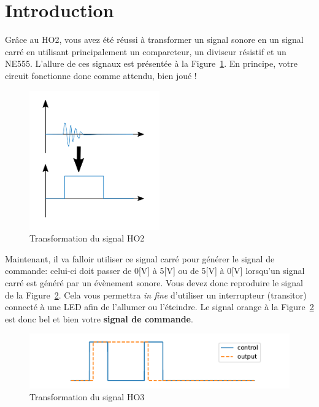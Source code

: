 \section{Introduction}

Grâce au HO2, vous avez été réussi à transformer un signal sonore en un signal carré en utilisant principalement un compareteur, un diviseur résistif et un NE555. L'allure de ces signaux est présentée à la Figure~\ref{fig:signal-all}. En principe, votre circuit fonctionne donc comme attendu, bien joué !

\begin{figure}[h!]
    \centering
    \includegraphics[width=0.5\textwidth]{signals.PNG}
    \caption{Transformation du signal HO2}
    \label{fig:signal-all}
\end{figure}

Maintenant, il va falloir utiliser ce signal carré pour générer le signal de commande: celui-ci doit passer de 0[V] à 5[V] ou de 5[V] à 0[V] lorsqu'un signal carré est généré par un évènement sonore. Vous devez donc reproduire le signal de la Figure~\ref{fig:signal-all_HO3}. Cela vous permettra \textit{in fine} d'utiliser un interrupteur (transitor) connecté à une LED afin de l'allumer ou l'éteindre. Le signal orange à la Figure~\ref{fig:signal-all_HO3} est donc bel et bien votre \textbf{signal de commande}. \\

\begin{figure}[h!]
    \centering
    \includegraphics[width=1\textwidth]{figures/signals_control.pdf}
    \caption{Transformation du signal HO3}
    \label{fig:signal-all_HO3}
\end{figure}